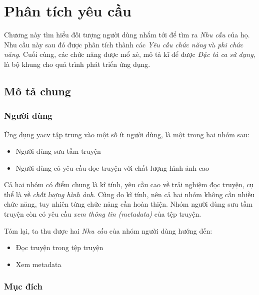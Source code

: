 \documentclass[../../thesis]{subfiles}
\begin{document}
\chapter{Phân tích yêu cầu}\label{chap:requirements}

Chương này tìm hiểu đối tượng người dùng nhắm tới để tìm ra \emph{Nhu cầu} của
họ. Nhu cầu này sau đó được phân tích thành các \emph{Yêu cầu chức năng} và
\emph{phi chức năng}. Cuối cùng, các chức năng được mổ xẻ, mô tả kĩ để được
\emph{Đặc tả ca sử dụng}, là bộ khung cho quá trình phát triển ứng dụng.



\section{Mô tả chung}\label{sec:overview}

\subsection{Người dùng}\label{sec:users}

Ứng dụng yacv tập trung vào một số ít người dùng, là một trong hai nhóm sau:

\begin{itemize}
    \item
        Người dùng sưu tầm truyện
    \item
        Người dùng có yêu cầu đọc truyện với chất lượng hình ảnh cao
\end{itemize}

Cả hai nhóm có điểm chung là kĩ tính, yêu cầu cao về trải nghiệm đọc truyện, cụ
thể là về \emph{chất lượng hình ảnh}. Cũng do kĩ tính, nên cả hai nhóm không cần
nhiều chức năng, tuy nhiên từng chức năng cần hoàn thiện. Nhóm người dùng sưu
tầm truyện còn có yêu cầu \emph{xem thông tin (metadata)} của tệp truyện.

Tóm lại, ta thu được hai \emph{Nhu cầu} của nhóm người dùng hướng đến:

\begin{itemize}
    \item Đọc truyện trong tệp truyện
    \item Xem metadata
\end{itemize}

\subsection{Mục đích}\label{sec:objectives}
\end{document}

